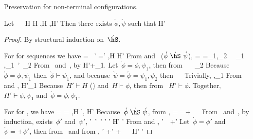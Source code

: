 Preservation for non-terminal configurations.
\begin{lemma}
\label{Lemma:Preservation2}
Let
    \acute{\phi}~\acute{\hS}~\acute{\psi}
    \gap
    \vdash \acute{\hS}
    \gap
    \vdash H
    \gap
    H \vdash \acute{\phi}
    \gap
    \acute{\hS},H \reducesto \grave{\hS},H'
\eeq
Then there exists $\grave{\phi},\grave{\psi}$ such
    that
H' \vdash \grave{\phi}
\gap
\grave{\phi}~\grave{\hS}~\grave{\psi}
\gap
\grave{\phi} \vdash \acute{\phi}
\gap
\grave{\psi} \vdash \acute{\psi}
\eeq
\end{lemma}
\begin{proof}
By structural induction on~$\acute{\hS}$.

For  for sequences we have
 \acute{\hS} = \hS~\hS' \gap
 \grave{\hS}=\hS' \gap
 \hS,H \reduce H'
\eeq
From  and~ ($\acute{\phi}~\acute{\hS}~\acute{\psi}$),
  \acute{\phi}=\phi
    \gap
  \acute{\psi}=\psi_1,\psi_2
    \gap
  \phi~\hS~\psi_1
    \gap
  \phi,\psi_1~\hS'~\psi_2
\eeq
From~ and~, by 
    H'\vdash +\psi_1.
\eeq
Let~$\grave{\phi}=\phi,\psi_1$, then from~
    \grave{\phi}~\grave{\hS}~\psi_2
\eeq
Because~$\grave{\phi}=\phi,\psi_1$ then~$\grave{\phi} \vdash \psi_1$, and because~$\grave{\psi}=\acute{\psi}=\psi_1,\psi_2$ then
    \grave{\phi}~\grave{\hS}~\grave{\psi}
\eeq
Trivially,
    \phi,\psi_1 \vdash \phi
    \gap
    \grave{\psi} \vdash \acute{\psi}
\eeq
From~ and ,
    H'\vdash \psi_1
\eeq
Because~$H' \vdash H$ () and~$H \vdash\phi$, then from ~$H' \vdash\phi$.
Together,~$H' \vdash \phi,\psi_1$ and~$\grave{\phi}=\phi,\psi_1$.


For  for \hfinish, we have
 \acute{\hS} = \finish{\hS} \gap
 \grave{\hS}= \gap
 \hS,H \reduce \hS', H'
\eeq
Because~$\acute{\phi}~\acute{\hS}~\acute{\psi}$, from ,
  \acute{\phi}=\phi
    \gap
  \acute{\psi}=+\psi
    \gap
  \phi~\hS~\psi
\eeq
From~ and~, by induction, exists~$\phi'$ and~$\psi'$,
  \phi'~\hS'~\psi'
    \gap
  \phi' \vdash \phi
    \gap
  \psi' \vdash \psi
    \gap
  H' \vdash \phi'
\eeq
From  and ,
  \phi'~~+\psi'
\eeq
Let~$\grave{\phi}=\phi'$ and~$\grave{\psi}=+\psi'$, then from~ and
    from ,
    \phi' \vdash \phi
    \gap
    +\psi' \vdash +\psi
    \gap
    \grave{\phi}~\grave{\hS}~\grave{\psi}
    \gap
    H' \vdash \phi'
\eeq


\end{proof}
